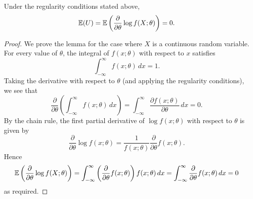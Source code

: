 %


\begin{lemma}\label{lem:expe_score_function}
Under the regularity conditions stated above,
\[
\mathbb{E}(U) = \mathbb{E}\left(\frac{\partial}{\partial\theta}\log f(X;\theta)\right) = 0.
\]
\begin{proof}
We prove the lemma for the case where $X$ is a continuous random variable. For every value of $\theta$, the integral of $f(x;\theta)$ with respect to $x$ satisfies
\[
\int_{-\infty}^{\infty} f(x;\theta)\,dx = 1.
\]
Taking the derivative with respect to $\theta$ (and applying the regularity conditions), we see that
\[
\frac{\partial}{\partial\theta}\left(\int_{-\infty}^{\infty} f(x;\theta)\,dx\right)
	= \int_{-\infty}^{\infty} \frac{\partial f(x;\theta)}{\partial\theta} \,dx 
	= 0.
\]
By the chain rule, the first partial derivative of $\log f(x;\theta)$ with respect to $\theta$ is given by
\[
\frac{\partial}{\partial\theta}\log f(x;\theta)  
	= \frac{1}{f(x;\theta)}\frac{\partial}{\partial\theta} f(x;\theta).
\]
Hence
\begin{align*}
\mathbb{E}\left(\frac{\partial}{\partial\theta}\log f(X;\theta)\right)
	= \int_{-\infty}^{\infty} \left(\frac{\partial}{\partial\theta}f(x;\theta)\right) f(x;\theta)\,dx 
	= \int_{-\infty}^{\infty} \frac{\partial}{\partial\theta}f(x;\theta)\,dx 
	= 0
\end{align*}
as required.
\end{proof}
\end{lemma}

